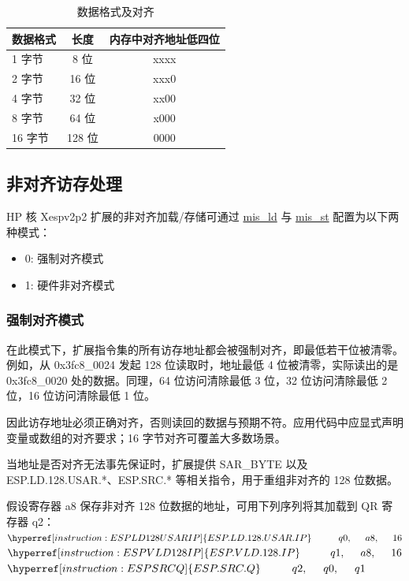 \documentclass[main\_\_CN.tex]{subfiles}
\begin{document}
\begin{table}[H]
\centering
\caption{数据格式及对齐}
\label{tab:pie_data_format_align}
\begin{tabular}{|l|c|c|}
\hline
    \rowcolor{lightgray}
    \textbf{数据格式}  & \textbf{长度} & \textbf{内存中对齐地址低四位} \\\hline

    1 字节 & 8 位 & xxxx \\\hline
    2 字节 & 16 位 & xxx0 \\\hline
    4 字节 & 32 位 & xx00 \\\hline
    8 字节 & 64 位 & x000 \\\hline
    16 字节 & 128 位 & 0000 \\\hline
    \end{tabular}
\end{table}

\subsection{非对齐访存处理}

\chipname{} HP 核 Xespv2p2 扩展的非对齐加载/存储可通过 \hyperref[mis_ld]{mis\_ld} 与 \hyperref[mis_st]{mis\_st} 配置为以下两种模式：
\begin{itemize}
    \item 0: 强制对齐模式
    \item 1: 硬件非对齐模式
\end{itemize}



\subsubsection{强制对齐模式}

在此模式下，扩展指令集的所有访存地址都会被强制对齐，即最低若干位被清零。例如，从 0x3fc8\_0024 发起 128 位读取时，地址最低 4 位被清零，实际读出的是 0x3fc8\_0020 处的数据。同理，64 位访问清除最低 3 位，32 位访问清除最低 2 位，16 位访问清除最低 1 位。

因此访存地址必须正确对齐，否则读回的数据与预期不符。应用代码中应显式声明变量或数组的对齐要求；16 字节对齐可覆盖大多数场景。

当地址是否对齐无法事先保证时，扩展提供 SAR\_BYTE 以及 ESP.LD.128.USAR.*、ESP.SRC.* 等相关指令，用于重组非对齐的 128 位数据。

假设寄存器 a8 保存非对齐 128 位数据的地址，可用下列序列将其加载到 QR 寄存器 q2：\\
$ \hyperref[instruction:ESPLD128USARIP]{ESP.LD.128.USAR.IP}\hspace{1cm}q0,\hspace{0.5cm}a8,\hspace{0.5cm}16 $ \\
$ \hyperref[instruction:ESPVLD128IP]{ESP.VLD.128.IP}\hspace{1cm}q1,\hspace{0.5cm}a8,\hspace{0.5cm}16 $ \\
$ \hyperref[instruction:ESPSRCQ]{ESP.SRC.Q}\hspace{1cm}q2,\hspace{0.5cm}q0,\hspace{0.5cm}q1 $
\end{document}
